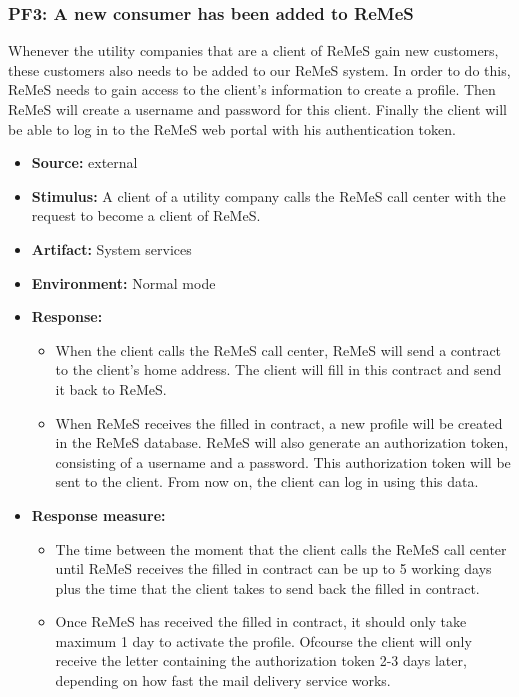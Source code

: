 \subsubsection{PF3: A new consumer has been added to ReMeS}
Whenever the utility companies that are a client of ReMeS gain new customers, these customers
also needs to be added to our ReMeS system. In order to do this, ReMeS needs to gain access to
the client's information to create a profile. Then ReMeS will create a username and password for
this client. Finally the client will be able to log in to the ReMeS web portal with his authentication token.
\begin{itemize}
	\item \textbf{Source:} external
	\item \textbf{Stimulus:} 
		A client of a utility company calls the ReMeS call center with the request to become a client of ReMeS.
	\item \textbf{Artifact:} System services
	\item \textbf{Environment:} Normal mode
	\item \textbf{Response:} 
		\begin{itemize}
			\item When the client calls the ReMeS call center, ReMeS will send a contract to the client's home address.
					The client will fill in this contract and send it back to ReMeS.
			\item When ReMeS receives the filled in contract, a new profile will be created in the ReMeS database. ReMeS
					will also generate an authorization token, consisting of a username and a password. This authorization token
					will be sent to the client. From now on, the client can log in using this data.
		\end{itemize}
	\item \textbf{Response measure:} 
		\begin{itemize}
			\item The time between the moment that the client calls the ReMeS call center until ReMeS receives the filled in contract
					can be up to 5 working days plus the time that the client takes to send back the filled in contract.
			\item Once ReMeS has received the filled in contract, it should only take maximum 1 day to activate the profile. Ofcourse
					the client will only receive the letter containing the authorization token 2-3 days later, depending on how fast
					the mail delivery service works.
		\end{itemize}
\end{itemize}